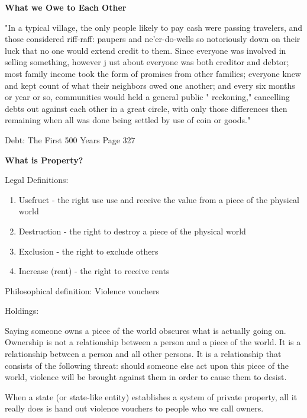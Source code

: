 \documentclass{article}
\begin{document}
\pagebreak
{\huge \textbf{What we Owe to Each Other}}


"In a typical village, the only people likely to pay cash were passing
travelers, and those considered riff-raff: paupers and ne'er-do-wells so
notoriously down on their luck that no one would extend credit to
them. Since everyone was involved in selling something, however j ust
about everyone was both creditor and debtor; most family income took
the form of promises from other families; everyone knew and kept
count of what their neighbors owed one another; and every six months
or year or so, communities would held a general public " reckoning,"
cancelling debts out against each other in a great circle, with only those
differences then remaining when all was done being settled by use of
coin or goods."

Debt: The First 500 Years Page 327


\pagebreak
{\huge \textbf{What is Property?}}

\large Legal Definitions:

\begin{enumerate}
	
	\item Usefruct - the right use use and receive the value from a piece of the physical world

	\item Destruction - the right to destroy a piece of the physical world

	\item Exclusion -  the right to exclude others
 
	\item Increase (rent) - the right to receive rents
\end{enumerate}
	
\large Philosophical definition: Violence vouchers

\large Holdings:

Saying someone owns a piece of the world obscures what is actually going on. Ownership is not a relationship between a person and a piece of the world. It is a relationship between a person and all other persons. It is a relationship that consists of the following threat: should someone else act upon this piece of the world, violence will be brought against them in order to cause them to desist.

When a state (or state-like entity) establishes a system of private property, all it really does is hand out violence vouchers to people who we call owners. 
\end{document}
